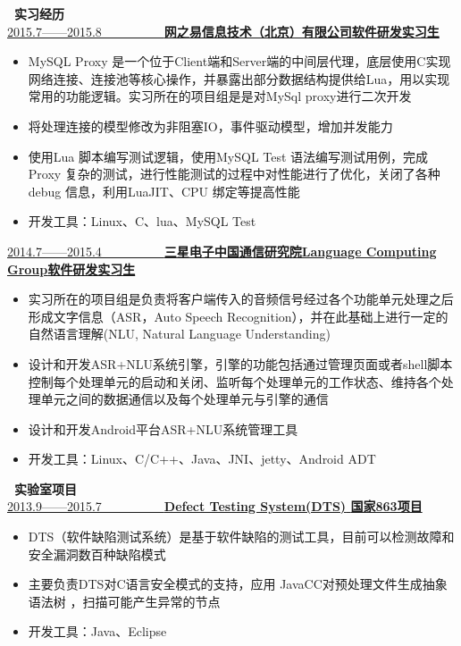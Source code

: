 ﻿\documentclass[UTF8, winfonts]{ctexart}
\begin{document}
\noindent \textbf{ \heiti \faBriefcase\ 实习经历}\\
\uline{2015.7——2015.8~~~~~~~~~~\bf{网之易信息技术（北京）有限公司}\hfill \bf{软件研发实习生}}
\begin{itemize}
  \setlength{\itemsep}{0pt}
  \setlength{\parsep}{3pt}
  \setlength{\parskip}{3pt}
  \item {}MySQL Proxy 是一个位于Client端和Server端的中间层代理，底层使用C实现网络连接、连接池等核心操作，并暴露出部分数据结构提供给Lua，用以实现常用的功能逻辑。实习所在的项目组是是对MySql proxy进行二次开发%
  \item {}将处理连接的模型修改为非阻塞IO，事件驱动模型，增加并发能力
  \item {}使用Lua 脚本编写测试逻辑，使用MySQL Test 语法编写测试用例，完成Proxy 复杂的测试，进行性能测试的过程中对性能进行了优化，关闭了各种debug 信息，利用LuaJIT、CPU 绑定等提高性能
  \item {}开发工具：Linux、C、lua、MySQL Test
\end{itemize}
\uline{2014.7——2015.4~~~~~~~~~~\bf{三星电子中国通信研究院Language Computing Group}\hfill \bf{软件研发实习生}}
\begin{itemize}
  \setlength{\itemsep}{0pt}
  \setlength{\parsep}{3pt}
  \setlength{\parskip}{3pt}
  \item {}实习所在的项目组是负责将客户端传入的音频信号经过各个功能单元处理之后形成文字信息（ASR，Auto Speech Recognition），并在此基础上进行一定的自然语言理解(NLU, Natural Language Understanding)
  \item {}设计和开发ASR+NLU系统引擎，引擎的功能包括通过管理页面或者shell脚本控制每个处理单元的启动和关闭、监听每个处理单元的工作状态、维持各个处理单元之间的数据通信以及每个处理单元与引擎的通信
  \item {}设计和开发Android平台ASR+NLU系统管理工具
  \item {}开发工具：Linux、C/C++、Java、JNI、jetty、Android ADT
\end{itemize}
\noindent \textbf{ \heiti \faUniversity\ 实验室项目}\\
\uline{2013.9——2015.7~~~~~~~~~~\bf{Defect Testing System(DTS)} \hfill \bf{国家863项目}}
\begin{itemize}
  \setlength{\itemsep}{0pt}
  \setlength{\parsep}{3pt}
  \setlength{\parskip}{3pt}
  \item {}DTS（软件缺陷测试系统）是基于软件缺陷的测试工具，目前可以检测故障和安全漏洞数百种缺陷模式
  \item {}主要负责DTS对C语言安全模式的支持，应用 JavaCC对预处理文件生成抽象语法树 ，扫描可能产生异常的节点
  \item {}开发工具：Java、Eclipse
\end{itemize}
\end{document}
